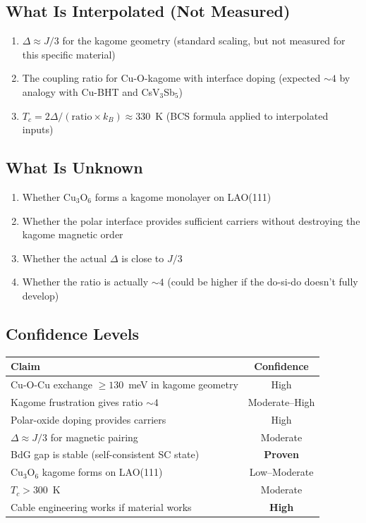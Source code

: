 \documentclass[11pt, a4paper]{article}
\begin{document}
\subsection{What Is Interpolated (Not Measured)}

\begin{enumerate}[nosep]
  \item $\Delta \approx J/3$ for the kagome geometry (standard
        scaling, but not measured for this specific material)
  \item The coupling ratio for Cu-O-kagome with interface doping
        (expected $\sim 4$ by analogy with Cu-BHT and CsV$_3$Sb$_5$)
  \item $T_c = 2\Delta / (\text{ratio} \times k_B) \approx 330$~K
        (BCS formula applied to interpolated inputs)
\end{enumerate}

\subsection{What Is Unknown}

\begin{enumerate}[nosep]
  \item Whether Cu$_3$O$_6$ forms a kagome monolayer on LAO(111)
  \item Whether the polar interface provides sufficient carriers
        without destroying the kagome magnetic order
  \item Whether the actual $\Delta$ is close to $J/3$
  \item Whether the ratio is actually $\sim 4$ (could be higher
        if the do-si-do doesn't fully develop)
\end{enumerate}

\subsection{Confidence Levels}

\begin{center}
\begin{tabular}{@{}lc@{}}
\toprule
\textbf{Claim} & \textbf{Confidence} \\
\midrule
Cu-O-Cu exchange $\geq 130$~meV in kagome geometry & High \\
Kagome frustration gives ratio $\sim 4$ & Moderate--High \\
Polar-oxide doping provides carriers & High \\
$\Delta \approx J/3$ for magnetic pairing & Moderate \\
BdG gap is stable (self-consistent SC state) & \textbf{Proven} \\
Cu$_3$O$_6$ kagome forms on LAO(111) & Low--Moderate \\
$T_c > 300$~K & Moderate \\
Cable engineering works if material works & \textbf{High} \\
\bottomrule
\end{tabular}
\end{center}
\end{document}
